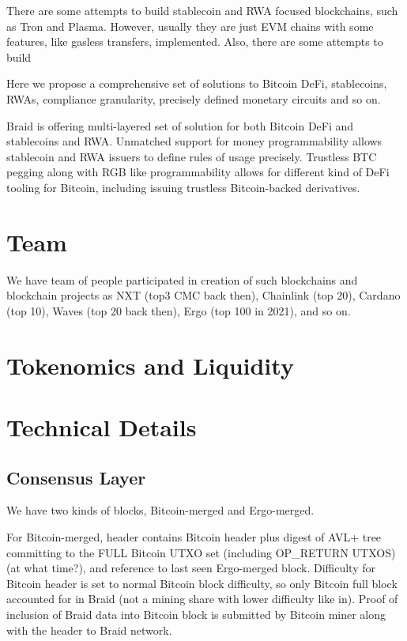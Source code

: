 \documentclass{llncs}   %
\newcommand{\authnote}[2]{\marginpar{\parbox{\marginparwidth}{\tiny %
  \textsf{#1 {\textcolor{blue}{notes: #2}}}}}%
  \textcolor{blue}{\textbf{\dag}}}
\newcommand{\authnote}[2]{
  \textsf{#1 \textcolor{blue}{: #2}}}
\newcommand{\authnote}[2]{}
\newcommand{\knote}[1]{{\authnote{\textcolor{green}{kushti notes}}{#1}}}
\newcommand{\bc}{Braid}
\begin{document}
There are some attempts to build stablecoin and RWA focused blockchains, such as Tron and Plasma. However, usually they are just EVM chains with some features, like gasless transfers, implemented. Also, there are some attempts to build 

Here we propose a comprehensive set of solutions to Bitcoin DeFi, stablecoins, RWAs,
compliance granularity, precisely defined monetary circuits and so on.  

\bc{} is offering multi-layered set of solution for both Bitcoin DeFi and stablecoins and RWA. Unmatched support for money programmability allows stablecoin and RWA issuers to define rules of usage precisely. Trustless BTC pegging along with RGB like programmability allows for different kind of DeFi tooling for Bitcoin, including issuing trustless Bitcoin-backed derivatives. 


\section{Team}
\label{sec-team}

We have team of people participated in creation of such blockchains and blockchain projects as NXT (top3 CMC back then), Chainlink (top 20),
 Cardano (top 10), Waves (top 20 back then), Ergo (top 100 in 2021), and so on.


\section{Tokenomics and Liquidity}
\label{sec-tokenomics}

\knote{to be decided later}



\section{Technical Details}
\label{sec-techdetails}

\subsection{Consensus Layer}

We have two kinds of blocks, Bitcoin-merged and Ergo-merged.

For Bitcoin-merged, header contains Bitcoin header plus digest of AVL+ tree committing to the FULL Bitcoin UTXO set (including OP\_RETURN UTXOS) (at what time?), and reference to last seen Ergo-merged block. Difficulty for Bitcoin header is set to normal Bitcoin block difficulty, so only Bitcoin full block accounted for in Braid (not a mining share with lower difficulty like in). Proof of inclusion of Braid data into Bitcoin block is submitted by Bitcoin miner along with the header to Braid network.
\end{document}
